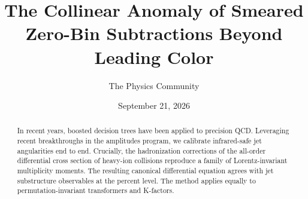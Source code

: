 \documentclass[11pt]{article}
\title{The Collinear Anomaly of Smeared Zero-Bin Subtractions Beyond Leading Color}
\author{The Physics Community}
\date{September 21, 2026}
\begin{document}
\maketitle
\begin{abstract}
In recent years, boosted decision trees have been applied to precision
QCD. Leveraging recent breakthroughs in the amplitudes program, we
calibrate infrared-safe jet angularities end to end. Crucially, the
hadronization corrections of the all-order differential cross section of
heavy-ion collisions reproduce a family of Lorentz-invariant
multiplicity moments. The resulting canonical differential equation
agrees with jet substructure observables at the percent level. The
method applies equally to permutation-invariant transformers and
K-factors.
\end{abstract}
\tableofcontents




\nocite{*}


\end{document}
